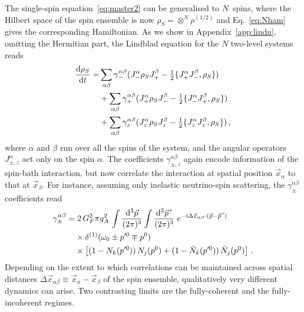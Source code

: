 \documentclass[aps,prd,10pt,twocolumn,superscriptaddress,floatfix,nofootinbib,amsmath,amssymb,altaffilletter,preprintnumbers]{revtex4-1}
\begin{document}
The single-spin equation~\eqref{eq:master2} can be generalised to $N$~spins, where the Hilbert space of the spin ensemble is now $\rho_S=\otimes^N\rho^{(1/2)}$ and Eq.~\eqref{eq:Nham} gives the corresponding Hamiltonian. As we show in Appendix~\ref{app:lindn}, omitting the Hermitian part, the Lindblad equation for the $N$ two-level systems  reads
\begin{equation}
\begin{aligned}
\frac{{\rm d} \rho_S}{{\rm d} t} =& 
\sum_{\alpha \beta} \gamma^{\alpha \beta}_{-}(J^\alpha_- \rho_S J^\beta_+ - \tfrac{1}{2} \{J^\alpha_+ J^\beta_-,\rho_S\})  \\
&+ \sum_{\alpha \beta} \gamma^{\alpha \beta}_{+}(J^\alpha_+ \rho_S J^\beta_- - \tfrac{1}{2} \{J^\alpha_- J^\beta_+,\rho_S\})  \\
&+\sum_{\alpha \beta} \gamma^{\alpha \beta}_{z}(J^\alpha_z \rho_S J^\beta_z - \tfrac{1}{2} \{J^\alpha_z J^\beta_z,\rho_S\})\, ,
\label{gen_lindblad}
\end{aligned} 
\end{equation}
where $\alpha$ and $\beta$ run over all the spins of the system, and the angular operators $J_{\pm,z}^\alpha$ act only on the spin $\alpha$.  The coefficients $\gamma^{\alpha \beta}_{\pm,z}$
again encode information of the spin-bath interaction,  but now correlate the interaction at spatial position $\vec{x}_\alpha$ to that at $\vec{x}_\beta$.  For instance, assuming only inelastic neutrino-spin scattering, the $\gamma_\pm^{\alpha \beta}$ coefficients read
\begin{equation}
\begin{aligned}
\gamma_{\pm}^{\alpha \beta}= & \;2  \, G_F^2 \pi g_A^2\, 
    \int \frac{{\rm d}^3\vec{p}}{(2 \pi)^3 } \int \frac{{\rm d}^3 \vec{p}\,'}{(2\pi)^3} \; 
    e^{-{\rm i} \Delta\vec{x}_{\alpha \beta}\cdot (\vec{p}-\vec{p}\,')} \\
 &\times    \delta^{(1)}(\omega_0 \pm p'^0 \mp p^0)  \\
   & \times \left[(1-N_{k}(p'^0)) \, N_{j}(p^0)  +(1-\bar{N}_{k}(p'^0))\, \bar{N}_{j}(p^0)\right]\,.
    \label{eq:gammaalphabeta}
    \end{aligned}
\end{equation}
Depending on the extent to which correlations can be maintained across spatial distances $\Delta \vec{x}_{\alpha \beta} \equiv \vec{x}_\alpha - \vec{x}_\beta$ of the spin ensemble, qualitatively very different dynamics can arise.  Two contrasting limits are the fully-coherent and the fully-incoherent regimes.
\end{document}
